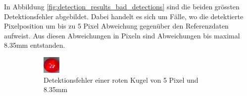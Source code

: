 
In Abbildung \ref{fig:detection_results_bad_detections} sind die beiden grössten Detektionsfehler abgebildet.
Dabei handelt es sich um Fälle, wo die detektierte Pixelposition um bis zu 5 Pixel Abweichung gegenüber den Referenzdaten aufweist.
Aus diesen Abweichungen in Pixeln sind Abweichungen bis maximal 8.35mm entstanden.

\begin{figure}[h!]
    \centering
    \begin{subfigure}[t]{0.3\textwidth}
        \centering
        \includegraphics[width=1.0\linewidth]{../common/04_results/resources/bad_detection_4_8.356600_5.099020.png}
        \caption{Detektionsfehler einer roten Kugel von 5 Pixel und 8.35mm}
        \label{fig:detection_results_bad_detection_1}
    \end{subfigure}
    \begin{subfigure}[t]{0.3\textwidth}
        \centering

\end{subfigure}
\end{figure}
